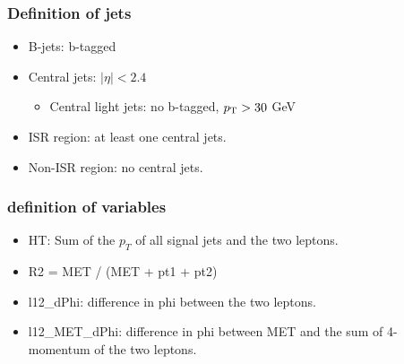 \documentclass[mathserif,serif]{beamer}
\begin{document}
\begin{frame}
\frametitle{Definition of jets}
\normalsize
\begin{itemize}
\item B-jets: b-tagged
\item Central jets: $|\eta|<2.4$
\begin{itemize}
\item Central light jets: no b-tagged, $p_{\text{T}}>30$ GeV
\end{itemize}
\item ISR region: at least one central jets.
\item Non-ISR region: no central jets.
\end{itemize}
\end{frame}

\begin{frame}
\frametitle{definition of variables}
\normalsize
\begin{itemize}
\item HT: Sum of the $p_T$ of all signal jets and the two leptons.
\item R2 = MET / (MET + pt1 + pt2)
\item l12\_dPhi: difference in phi between the two leptons.
\item l12\_MET\_dPhi: difference in phi between MET and the sum of 4-momentum of the two leptons.
\end{itemize}
\end{frame}

%
%
\end{document}
